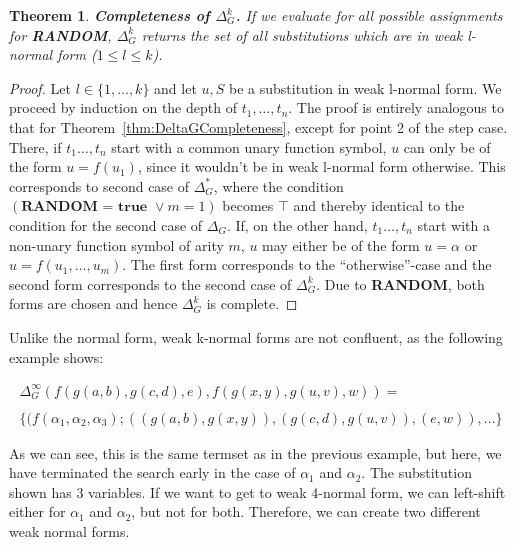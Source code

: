 \documentclass[a4paper, 11pt]{report}
\newtheorem{theorem}{Theorem}
\begin{document}


\begin{theorem}
\textbf{Completeness of $\Delta_G^k$.}
If we evaluate for all possible assignments for \textbf{RANDOM}, $\Delta_G^k$ returns the set of all substitutions which are in weak l-normal form ($1 \leq l \leq k$).
\label{thm:DeltaGkCompletenss}
\end{theorem}

\begin{proof}
Let $l \in \{1,\dots,k\}$ and let $u,S$ be a substitution in weak l-normal form. We proceed by induction on the depth of $t_1,\dots,t_n$.
The proof is entirely analogous to that for Theorem~\ref{thm:DeltaGCompleteness}, except for point 2 of the step case.
There, if $t_1\dots,t_n$ start with a common unary function symbol, $u$ can only be of the form $u=f(u_1)$, since it wouldn't be in weak l-normal form otherwise. This corresponds to second case of $\Delta_G^*$, where the condition $(\textbf{RANDOM = true } \vee m=1)$ becomes $\top$ and thereby identical to the condition for the second case of $\Delta_G$.
If, on the other hand, $t_1\dots,t_n$ start with a non-unary function symbol of arity $m$, $u$ may either be of the form $u=\alpha$ or $u=f(u_1,\dots,u_m)$. The first form corresponds to the ``otherwise''-case and the second form corresponds to the second case of $\Delta_G^k$. Due to \textbf{RANDOM}, both forms are chosen and hence $\Delta_G^k$ is complete.
\end{proof}

\medskip

Unlike the normal form, weak k-normal forms are not confluent, as the following example shows:

$$
\begin{array}{l}
\Delta_G^\infty(f(g(a,b),g(c,d),e), f(g(x,y),g(u,v),w)) =\\
\\
\{(f(\alpha_1,\alpha_2,\alpha_3); ((g(a,b),g(x,y)), (g(c,d),g(u,v)), (e,w)),\dots \}
\end{array}
$$

As we can see, this is the same termset as in the previous example, but here, we have terminated the search early in the case of $\alpha_1$ and $\alpha_2$. The substitution shown has 3 variables. If we want to get to weak 4-normal form, we can left-shift either for $\alpha_1$ and $\alpha_2$, but not for both. Therefore, we can create two different weak normal forms.



\end{document}
